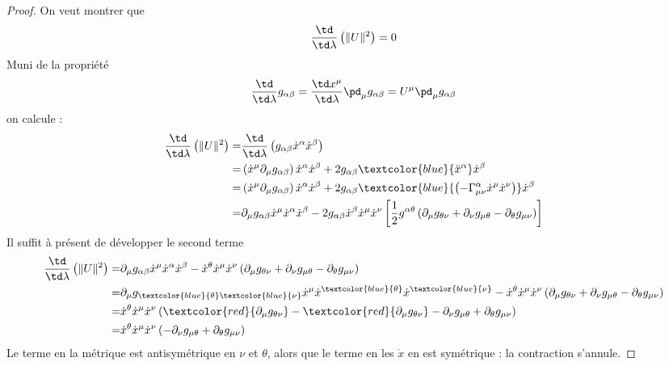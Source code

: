 \begin{proof}
    On veut montrer que 
    \begin{equation}
        \frac{\td }{\td \lambda}\left(\Vert  U \Vert ^2\right)=0
    \end{equation}
    Muni de la propriété 
    \begin{equation*}
    \frac{\td}{\td \lambda} g_{\alpha\beta} = \frac{\td x^\mu}{\td \lambda} \pd_\mu g_{\alpha\beta} = U^\mu \pd_\mu g_{\alpha\beta}
    \end{equation*}
    on calcule :
    \begin{align}
        \frac{\td }{\td \lambda}\left(\Vert  U \Vert ^2\right)
        =&\frac{\td }{\td \lambda}\left(g_{\alpha \beta}\dot{x}^{\alpha}\dot{x}^{\beta} \right)\\
        =&\left(\dot{x}^{\mu}\partial_{\mu}g_{\alpha \beta}\right)\dot{x}^{\alpha}\dot{x}^{\beta}  + 2g_{\alpha \beta}\textcolor{blue}{\ddot{x}^{\alpha}}\dot{x}^{\beta}\\
        =&\left(\dot{x}^{\mu}\partial_{\mu}g_{\alpha \beta}\right)\dot{x}^{\alpha}\dot{x}^{\beta} + 2g_{\alpha \beta}\textcolor{blue}{\left(-\Gamma^{\alpha}_{\mu \nu}\dot{x}^{\mu}\dot{x}^{\nu}\right)} \dot{x}^{\beta}\\
        =&\partial_{\mu}g_{\alpha \beta}\dot{x}^{\mu}\dot{x}^{\alpha}\dot{x}^{\beta} - 2g_{\alpha \beta}\dot{x}^{\beta}\dot{x}^{\mu}\dot{x}^{\nu}\left[\frac{1}{2}g^{\alpha \theta}\left(\partial_{\mu}g_{\theta\nu} + \partial_{\nu}g_{\mu \theta}-\partial_{\theta}g_{\mu \nu}\right)\right]
    \end{align}
    Il suffit à présent de développer le second terme 
    \begin{align}
        \frac{\td }{\td \lambda}\left(\Vert  U \Vert ^2\right)
        =&\partial_{\mu}g_{\alpha \beta}\dot{x}^{\mu}\dot{x}^{\alpha}\dot{x}^{\beta} - \dot{x}^{\theta}\dot{x}^{\mu}\dot{x}^{\nu}\left(\partial_{\mu}g_{\theta\nu} + \partial_{\nu}g_{\mu \theta}-\partial_{\theta}g_{\mu \nu}\right)\\
        =&\partial_{\mu}g_{\textcolor{blue}{\theta} \textcolor{blue}{\nu}}\dot{x}^{\mu}\dot{x}^{\textcolor{blue}{\theta}}\dot{x}^{\textcolor{blue}{\nu}} - \dot{x}^{\theta}\dot{x}^{\mu}\dot{x}^{\nu}\left(\partial_{\mu}g_{\theta\nu} + \partial_{\nu}g_{\mu \theta}-\partial_{\theta}g_{\mu \nu}\right)\\
        =&\dot{x}^{\theta}\dot{x}^{\mu}\dot{x}^{\nu}\left( \textcolor{red}{\partial_{\mu}g_{\theta\nu}} -\textcolor{red}{\partial_{\mu}g_{\theta\nu}} - \partial_{\nu}g_{\mu \theta}+\partial_{\theta}g_{\mu \nu} \right)\\
        =&\dot{x}^{\theta}\dot{x}^{\mu}\dot{x}^{\nu}\left( - \partial_{\nu}g_{\mu \theta}+\partial_{\theta}g_{\mu \nu} \right)\\
    \end{align}
    Le terme en la métrique est antisymétrique en $\nu$ et $\theta$, alors que le terme en les $\dot{x}$ en est symétrique : la contraction s'annule. 
\end{proof}
